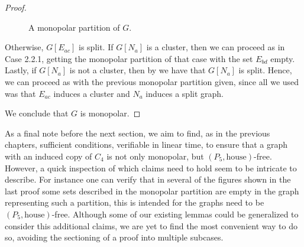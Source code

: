 \begin{proof}
\begin{figure}[htb!]
        \caption{A monopolar partition of $G$.}
        \label{fig:monopolar_partition_c4_case_2_2_2}
    \end{figure}
    
    Otherwise, $G[E_{ac}]$ is split. If $G[N_a]$ is a cluster, then we can
    proceed as in Case 2.2.1, getting the monopolar partition of that case with
    the set $E_{bd}$ empty. Lastly, if $G[N_a]$ is not a cluster, then by
     we have that $G[N_a]$ is split. Hence, we can proceed as
    with the previous monopolar partition given, since all we used was that
    $E_{ac}$ induces a cluster and $N_a$ induces a split graph.

    We conclude that $G$ is monopolar.
    
\end{proof}

As a final note before the next section, we aim to find, as in the previous
chapters, sufficient conditions, verifiable in linear time, to ensure that a
graph with an induced copy of $C_4$ is not only monopolar, but
$(P_5,\text{house})$-free. However, a quick inspection of which claims need to
hold seem to be intricate to describe. For instance one can verify that in
several of the figures shown in the last proof some sets described in the
monopolar partition are empty in the graph representing such a partition, this
is intended for the graphs need to be $(P_5,\text{house})$-free. Although some
of our existing lemmas could be generalized to consider this additional claims,
we are yet to find the most convenient way to do so, avoiding the sectioning of
a proof into multiple subcases.

